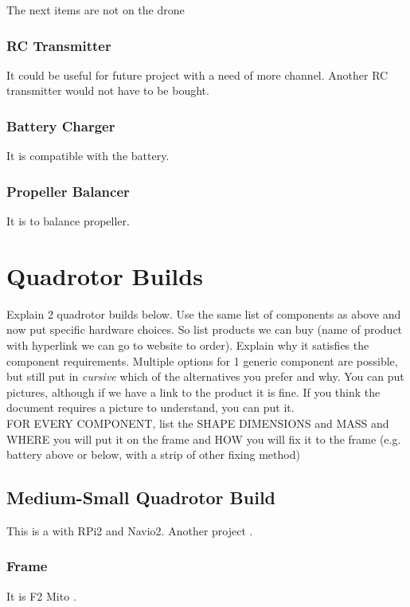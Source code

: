 {\color{blue}The next items are not on the drone}

\subsubsection{RC Transmitter}
It could be useful for future project with a need of more channel. Another RC transmitter would not have to be bought.

\subsubsection{Battery Charger}
It is compatible with the battery.

\subsubsection{Propeller Balancer}
It is to balance propeller.

\newpage
\section{Quadrotor Builds}
Explain 2 quadrotor builds below. Use the same list of components as above and now put specific hardware choices. So list products we can buy (name of product with hyperlink we can go to website to order). Explain why it satisfies the component requirements. Multiple options for 1 generic component are possible, but still put in \textit{cursive} which of the alternatives you prefer and why. You can put pictures, although if we have a link to the product it is fine. If you think the document requires a picture to understand, you can put it.\\
FOR EVERY COMPONENT, list the SHAPE DIMENSIONS and MASS and WHERE you will put it on the frame and HOW you will fix it to the frame (e.g. battery above or below, with a strip of other fixing method)
\subsection{Medium-Small Quadrotor Build}


This is a \cite{hackaday_navio} with RPi2 and Navio2.
Another project \cite{instructables_navio}.



\subsubsection{Frame}
It is F2 Mito \cite{bangood_f2_mito}.

